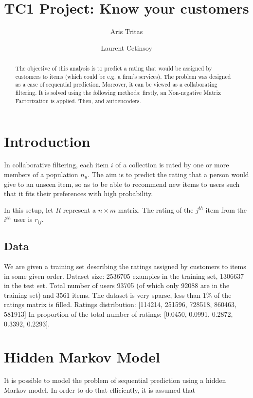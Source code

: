 \documentclass[10pt,twocolumn]{article}
\title{TC1 Project: Know your customers}
\author{Aris Tritas \and Laurent Cetinsoy}
\begin{document}
\maketitle

\begin{abstract}

The objective of this analysis is to predict a rating that would be assigned by customers to items (which could be e.g. a firm's services). 
The problem was designed as a case of sequential prediction. Moreover, it can be viewed as a collaborating filtering. It is solved using the following methods: firstly, an Non-negative Matrix Factorization is applied. Then,  and autoencoders.

\end{abstract}

\section{Introduction}

In collaborative filtering, each item $i$ of a collection is rated by one or more members of a population $n_u$. The aim is to predict the rating that a person would give to an unseen item, so as to be able to recommend new items to users such that it fits their preferences with high probability.

In this setup, let $R$ represent a $n \times m$ matrix. The rating of the $j^{th}$ item from the $i^{th}$ user is $r_{ij}$.

\subsection{Data}
We are given a training set describing the ratings assigned by customers to items in some given order.
Dataset size: 2536705 examples in the training set, 1306637 in the test set. Total number of users 93705 (of which only 92088 are in the training set) and 3561 items. The dataset is very sparse,  less than $1\% $ of the ratings matrix is filled.
Ratings distribution: [114214, 251596, 728518, 860463, 581913] In proportion of the total number of ratings: [0.0450, 0.0991, 0.2872, 0.3392, 0.2293].

\section{Hidden Markov Model}
It is possible to model the problem of sequential prediction using a hidden Markov model. In order to do that efficiently, it is assumed that 
\end{document}
